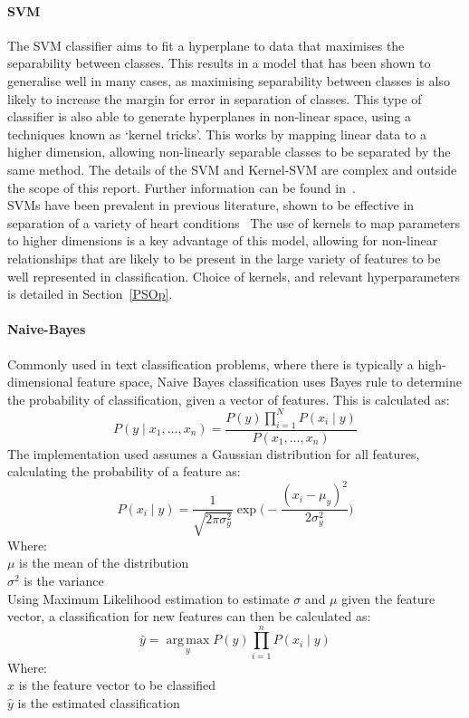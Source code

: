 \documentclass[titlepage, 12pt]{scrartcl} \usepackage{enumitem}
\DeclareMathOperator*{\argmax}{arg\,max}
\begin{document}
\paragraph{SVM}\label{SVM}
The SVM classifier aims to fit a hyperplane to data that maximises the
separability between classes. This results in a model that has been shown to
generalise well in many cases, as maximising separability between classes is
also likely to increase the margin for error in separation of classes. This
type of classifier is also able to generate hyperplanes in non-linear space,
using a techniques known as `kernel tricks'. This works by mapping linear data
to a higher dimension, allowing non-linearly separable classes to be separated
by the same method. The details of the SVM and Kernel-SVM are complex and
outside the scope of this report. Further information can be found
in~\parencite[p.187]{Tobergte2013a}.\\
SVMs have been prevalent in previous literature, shown to be effective in
separation of a variety of heart conditions~\parencite{Ari2010} The use of
kernels to map parameters to higher dimensions is a key advantage of this
model, allowing for non-linear relationships that are likely to be present in
the large variety of features to be well represented in classification. Choice
of kernels, and relevant hyperparameters is detailed in Section~\ref{PSOp}.

\paragraph{Naive-Bayes}
Commonly used in text classification problems, where there is typically a
high-dimensional feature space, Naive Bayes classification uses Bayes rule to
determine the probability of classification, given a vector of features. This
is calculated as:
\begin{equation}
    P(y\mid x_1,\ldots,x_n)=\frac{P(y)\prod\limits_{i=1}^{N}P(x_i\mid y)}{P(x_1,\ldots,x_n)}
\end{equation}
The implementation used assumes a Gaussian distribution for all features,
calculating the probability of a feature as:
\begin{equation}
    P(x_i\mid y)=\frac{1}{\sqrt{2\pi
    \sigma_y^2}}\exp\bigg(-\frac{(x_i-\mu_y)^2}{2\sigma^2_y}\bigg)
\end{equation}
Where:\\
$\mu$ is the mean of the distribution\\
$\sigma^2$ is the variance\\
Using Maximum Likelihood estimation to estimate $\sigma$ and $\mu$ given the
feature vector, a classification for new features can then be calculated as:
\begin{equation}
    \hat{y}=\argmax\limits_y P(y)\prod\limits_{i=1}^nP(x_i\mid y)
\end{equation}
Where:\\
$x$ is the feature vector to be classified\\
$\hat{y}$ is the estimated classification\\
\end{document}
